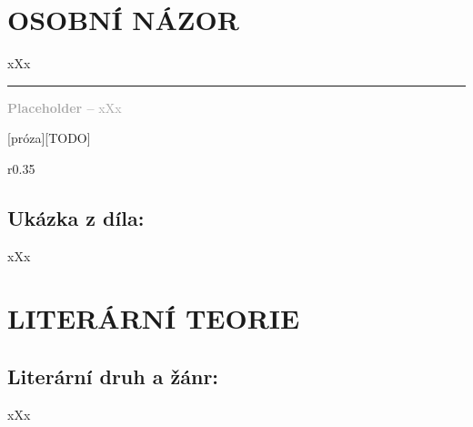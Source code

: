 \documentclass{extarticle} %
\begin{document}





\section*{OSOBNÍ NÁZOR}
\noindent 
xXx

\vfill

\noindent\begin{minipage}{\textwidth}
    \textcolor{darkgray}{\rule{\linewidth}{0.4pt}
    \footnotesize
    \textbf{Placeholder --} xXx
    }
\end{minipage}

\newpage


\changefontsize{8pt}

[próza][TODO]

\noindent\begin{wrapfigure}{r}{0.35\textwidth}
\tiny

\subsection*{Ukázka z díla:}
\setlength{\parindent}{3pt}
xXx
\end{wrapfigure}

\section*{LITERÁRNÍ TEORIE}

\subsection*{Literární druh a žánr:}
\noindent xXx
\end{document}
